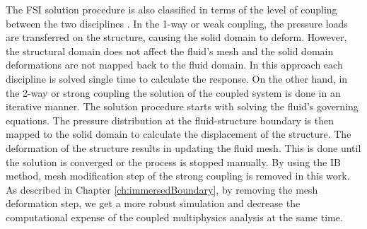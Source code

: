 The FSI solution procedure is also classified in terms of the level of coupling between the two disciplines \cite{hu2001direct}. In the 1-way or weak coupling, the pressure loads are transferred on the structure, causing the solid domain to deform. However, the structural domain does not affect the fluid's mesh and the solid domain deformations are not mapped back to the fluid domain. In this approach each discipline is solved single time to calculate the response. On the other hand, in the 2-way or strong coupling the solution of the coupled system is done in an iterative manner. The solution procedure starts with solving the fluid's governing equations. The pressure distribution at the fluid-structure boundary is then mapped to the solid domain to calculate the displacement of the structure. The deformation of the structure results in updating the fluid mesh. This is done until the solution is converged or the process is stopped manually. By using the IB method, mesh modification step of the strong coupling is removed in this work. As described in Chapter \ref{ch:immersedBoundary}, by removing the mesh deformation step, we get a more robust simulation and decrease the computational expense of the coupled multiphysics analysis at the same time.
